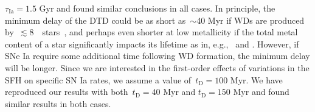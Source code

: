 \documentclass[ms.tex]{subfiles}
\begin{document}
$\tau_\text{Ia} = 1.5$ Gyr and found similar conclusions in all cases.
In principle, the minimum delay of the DTD could be as short as~$\sim$40 Myr if
WDs are produced by~$\lesssim$8~\msun~stars~\citep*[e.g.,][]{Hurley2000}, and
perhaps even shorter at low metallicity if the total metal content of a star
significantly impacts its lifetime as in, e.g.,~\citet{Kodama1997} and
\citet{Vincenzo2016}.
However, if SNe Ia require some additional time following WD formation, the
minimum delay will be longer.
Since we are interested in the first-order effects of variations in the SFH on
specific SN Ia rates, we assume a value of~$t_\text{D} = 100$ Myr.
We have reproduced our results with both~$t_\text{D} = 40$ Myr and
$t_\text{D} = 150$ Myr and found similar results in both cases.
\par
\end{document}
